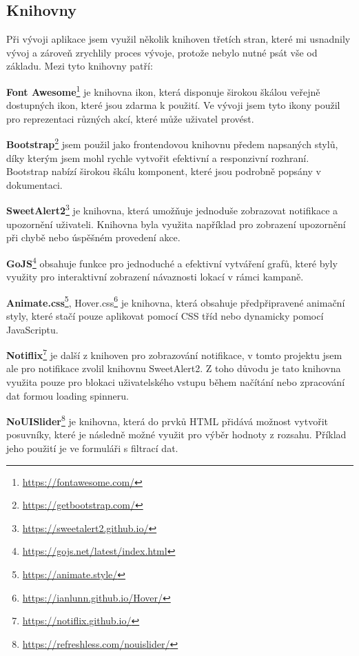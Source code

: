 \pagebreak


\subsection{Knihovny}
\label{subsec:implementation-technologies-libraries}
Při vývoji aplikace jsem využil několik knihoven třetích stran, které mi usnadnily vývoj a zároveň zrychlily proces vývoje, protože nebylo nutné psát vše od základu. Mezi tyto knihovny patří:

\begin{description}
    \item \textbf{Font Awesome}\footnote{\href{https://fontawesome.com/}{https://fontawesome.com/}} je knihovna ikon, která disponuje širokou škálou veřejně dostupných ikon, které jsou zdarma k použití. Ve vývoji jsem tyto ikony použil pro reprezentaci různých akcí, které může uživatel provést.
    \item \textbf{Bootstrap}\footnote{\href{https://getbootstrap.com/}{https://getbootstrap.com/}} jsem použil jako frontendovou knihovnu předem napsaných stylů, díky kterým jsem mohl rychle vytvořit efektivní a responzivní rozhraní. Bootstrap nabízí širokou škálu komponent, které jsou podrobně popsány v dokumentaci.
    \item \textbf{SweetAlert2}\footnote{\href{https://sweetalert2.github.io/}{https://sweetalert2.github.io/}} je knihovna, která umožňuje jednoduše zobrazovat notifikace a upozornění uživateli. Knihovna byla využita například pro zobrazení upozornění při chybě nebo úspěšném provedení akce.
    \item \textbf{GoJS}\footnote{\href{https://gojs.net/latest/index.html}{https://gojs.net/latest/index.html}} obsahuje funkce pro jednoduché a efektivní vytváření grafů, které byly využity pro interaktivní zobrazení návaznosti lokací v rámci kampaně.
    \item \textbf{Animate.css}\footnote{\href{https://animate.style/}{https://animate.style/}}, Hover.css\footnote{\href{https://ianlunn.github.io/Hover/}{https://ianlunn.github.io/Hover/}} je knihovna, která obsahuje předpřipravené animační styly, které stačí pouze aplikovat pomocí CSS tříd nebo dynamicky pomocí JavaScriptu.
    \item \textbf{Notiflix}\footnote{\href{https://notiflix.github.io/}{https://notiflix.github.io/}} je další z knihoven pro zobrazování notifikace, v tomto projektu jsem ale pro notifikace zvolil knihovnu SweetAlert2. Z toho důvodu je tato knihovna využita pouze pro blokaci uživatelského vstupu během načítání nebo zpracování dat formou loading spinneru.
    \item \textbf{NoUISlider}\footnote{\href{https://refreshless.com/nouislider/}{https://refreshless.com/nouislider/}} je knihovna, která do prvků HTML přidává možnost vytvořit posuvníky, které je následně možné využit pro výběr hodnoty z rozsahu. Příklad jeho použití je ve formuláři s filtrací dat.
\end{description}

